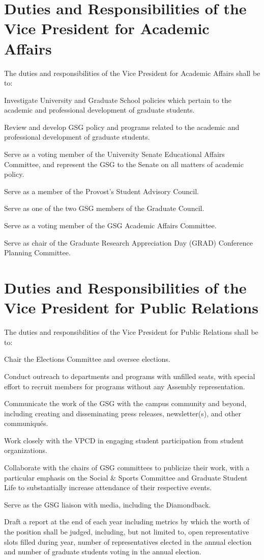 \section{Duties and Responsibilities of the Vice President for Academic Affairs}
The duties and responsibilities of the Vice President for Academic Affairs shall be to:
\begin{bylaws-number}
  \item Investigate University and Graduate School policies which pertain to the academic and professional development of graduate students.
  \item Review and develop GSG policy and programs related to the academic and professional development of graduate students.
  \item Serve as a voting member of the University Senate Educational Affairs Committee, and represent the GSG to the Senate on all matters of academic policy.
  \item Serve as a member of the Provost’s Student Advisory Council.
  \item Serve as one of the two GSG members of the Graduate Council.
  \item Serve as a voting member of the GSG Academic Affairs Committee.
\item Serve as chair of the Graduate Research Appreciation Day (GRAD) Conference Planning Committee.
\end{bylaws-number}

\section{Duties and Responsibilities of the Vice President for Public Relations}
The duties and responsibilities of the Vice President for Public Relations shall be to:
\begin{bylaws-number}
  \item Chair the Elections Committee and oversee elections.
  \item Conduct outreach to departments and programs with unfilled seats, with special effort to recruit members for programs without any Assembly representation.
  \item Communicate the work of the GSG with the campus community and beyond, including creating and disseminating press releases, newsletter(s), and other communiqués.
  \item Work closely with the VPCD in engaging student participation from student organizations.
  \item Collaborate with the chairs of GSG committees to publicize their work, with a particular emphasis on the Social \& Sports Committee and Graduate Student Life to substantially increase attendance of their respective events.
  \item Serve as the GSG liaison with media, including the Diamondback.
  \item Draft a report at the end of each year including metrics by which the worth of the position shall be judged, including, but not limited to, open representative slots filled during year, number of representatives elected in the annual election and number of graduate students voting in the annual election.
\end{bylaws-number}

